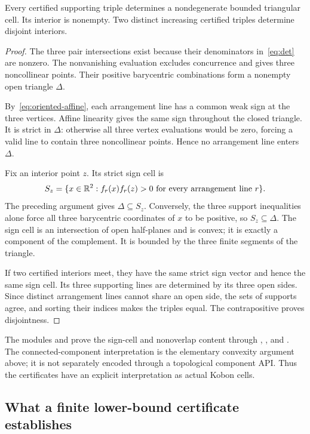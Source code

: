 \begin{theorem}\label{thm:certificate-cell}
Every certified supporting triple determines a nondegenerate bounded triangular cell. Its interior is nonempty. Two distinct increasing certified triples determine disjoint interiors.
\end{theorem}
\begin{proof}
The three pair intersections exist because their denominators in~\eqref{eq:det} are nonzero. The nonvanishing evaluation excludes concurrence and gives three noncollinear points. Their positive barycentric combinations form a nonempty open triangle $\Delta$.

By~\eqref{eq:oriented-affine}, each arrangement line has a common weak sign at the three vertices. Affine linearity gives the same sign throughout the closed triangle. It is strict in $\Delta$: otherwise all three vertex evaluations would be zero, forcing a valid line to contain three noncollinear points. Hence no arrangement line enters $\Delta$.

Fix an interior point $z$. Its strict sign cell is
\[
S_z=\{x\in\mathbb{R}^2:f_r(x)f_r(z)>0\text{ for every arrangement line }r\}.
\]
The preceding argument gives $\Delta\subseteq S_z$. Conversely, the three support inequalities alone force all three barycentric coordinates of $x$ to be positive, so $S_z\subseteq\Delta$. The sign cell is an intersection of open half-planes and is convex; it is exactly a component of the complement. It is bounded by the three finite segments of the triangle.

If two certified interiors meet, they have the same strict sign vector and hence the same sign cell. Its three supporting lines are determined by its three open sides. Since distinct arrangement lines cannot share an open side, the sets of supports agree, and sorting their indices makes the triples equal. The contrapositive proves disjointness.
\end{proof}

The modules  and  prove the sign-cell and nonoverlap content through , , and . The connected-component interpretation is the elementary convexity argument above; it is not separately encoded through a topological component API. Thus the certificates have an explicit interpretation as actual Kobon cells.

\subsection{What a finite lower-bound certificate establishes}

